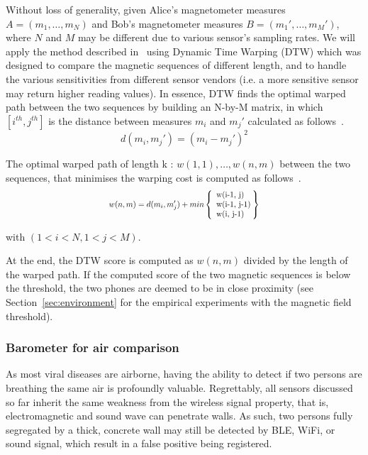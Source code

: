 \documentclass[graybox]{svmult}
\begin{document}
Without loss of generality, given Alice's magnetometer measures $A=(m_1, \dots, m_N)$ and Bob's magnetometer measures $B=(m_1', \dots, m_M')$, where $N$ and $M$ may be different due to various sensor's sampling rates. We will apply the method described in~\cite{nguyen2017co} using Dynamic Time Warping (DTW) which was designed to compare the magnetic sequences of different length, and to handle the various sensitivities from different sensor vendors (i.e. a more sensitive sensor may return higher reading values). In essence, DTW finds the optimal warped path between the two sequences by building an N-by-M matrix, in which $[i^{th}, j^{th}]$ is the distance between measures $m_i$ and $m_j'$ calculated as follows~\cite{nguyen2019realtime}.
\begin{equation}
    d(m_i, m_j') = (m_i - m_j')^2
\end{equation}

The optimal warped path of length k : $w(1,1), \dots, w(n,m)$ between the two sequences, that minimises the warping cost is computed as follows~\cite{nguyen2019realtime}.
\begin{equation}
    \hspace{130pt}
	w(n, m) = d(m_i, m'_j) + min\left\{\hspace{5pt}
	\begin{tabular}{@{}l@{}}
	w(i-1, j) \\
	w(i-1, j-1) \\
	w(i, j-1)
	\end{tabular}\hspace{2pt}
	\right\}\hspace{130pt}
\end{equation}

with $(1 < i < N, 1 < j < M)$.

At the end, the DTW score is computed as $w(n,m)$ divided by the length of the warped path. If the computed score of the two magnetic sequences is below the threshold, the two phones are deemed to be in close proximity (see Section~\ref{sec:environment} for the empirical experiments with the magnetic field threshold).



\subsubsection{Barometer for air comparison}
As most viral diseases are airborne, having the ability to detect if two persons are breathing the same air is profoundly valuable. Regrettably, all sensors discussed so far inherit the same weakness from the wireless signal property, that is, electromagnetic and sound wave can penetrate walls. As such, two persons fully segregated by a thick, concrete wall may still be detected by BLE, WiFi, or sound signal, which result in a false positive being registered.
\end{document}
